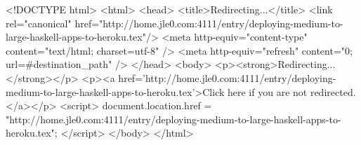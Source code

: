 <!DOCTYPE html>
<html>
<head>
<title>Redirecting...</title>
<link rel="canonical" href="http://home.jle0.com:4111/entry/deploying-medium-to-large-haskell-apps-to-heroku.tex"/>
<meta http-equiv="content-type" content="text/html; charset=utf-8" />
<meta http-equiv="refresh" content="0; url=#{destination_path}" />
</head>
<body>
  <p><strong>Redirecting...</strong></p>
  <p><a href='http://home.jle0.com:4111/entry/deploying-medium-to-large-haskell-apps-to-heroku.tex'>Click here if you are not redirected.</a></p>
  <script>
    document.location.href = "http://home.jle0.com:4111/entry/deploying-medium-to-large-haskell-apps-to-heroku.tex";
  </script>
</body>
</html>
